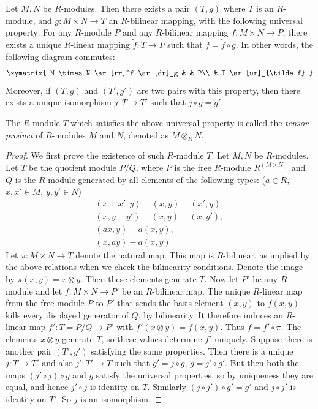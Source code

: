 \begin{lemma}
\label{editorial-source-lemma-tensor-product}
Let $M, N$ be $R$-modules. Then there exists a pair $(T, g)$
where $T$ is an $R$-module, and
$g : M \times N \to T$ an $R$-bilinear
mapping, with the following universal property:
For any $R$-module $P$ and any $R$-bilinear mapping
$f : M \times N \to P$, there
exists a unique $R$-linear
mapping $\tilde{f} : T \to P$ such that $f = \tilde{f} \circ g$.
In other words, the following diagram commutes:
$$
\xymatrix{
M \times N \ar[rr]^f \ar[dr]_g & & P\\
& T \ar[ur]_{\tilde f}
}
$$
Moreover, if $(T, g)$ and $(T', g')$
are two pairs with this property, then there
exists a unique isomorphism
$j : T \to T'$ such that $j\circ g = g'$.
\end{lemma}

\noindent
The $R$-module $T$ which satisfies the above universal property is called
the  {\it tensor product} of $R$-modules $M$ and $N$, denoted as
$M \otimes_R N$.

\begin{proof}
We first prove the existence of such $R$-module $T$.
Let $M, N$ be $R$-modules.
Let $T$ be the quotient module
$P/Q$, where $P$ is the free $R$-module $R^{(M \times N)}$ and $Q$ is the
$R$-module generated by all elements of
the following types: ($a\in R$, $x,x'\in M$, $y,y'\in N$)
\begin{align*}
(x + x', y) - (x, y) - (x', y), \\
(x, y + y') - (x, y) - (x, y'), \\
(ax, y) - a(x, y), \\
(x, ay) - a(x, y)
\end{align*}
Let $\pi : M \times N \to T$ denote the natural map.
This map is $R$-bilinear, as
implied by the above relations
when we check the bilinearity conditions. Denote the image by
$\pi(x, y) = x \otimes
y$. Then these elements generate
$T$. Now let $P'$ be any $R$-module and let
$f : M \times N \to P'$ be an $R$-bilinear map. The unique
$R$-linear map from the free module $P$ to $P'$ that sends the
basis element $(x,y)$ to $f(x,y)$ kills every displayed generator
of $Q$, by bilinearity. It therefore induces an $R$-linear map
$f' : T = P/Q \to P'$ with $f'(x\otimes y) = f(x,y)$.
Thus $f = f'\circ\pi$. The elements $x\otimes y$ generate $T$,
so these values determine $f'$ uniquely.
Suppose there is another pair $(T', g')$ satisfying the same properties.
Then there is a unique $j : T \to T'$ and
also $j' : T' \to T$ such that $g' = j\circ g$, $g = j'\circ g'$.
But then both the maps $(j'\circ j) \circ g$ and $g$
satisfy the universal properties, so by uniqueness they are equal,
and hence $j'\circ j$ is identity on $T$.
Similarly $(j\circ j') \circ g' = g'$ and $j\circ j'$ is identity on $T'$.
So $j$ is an isomorphism.
\end{proof}
